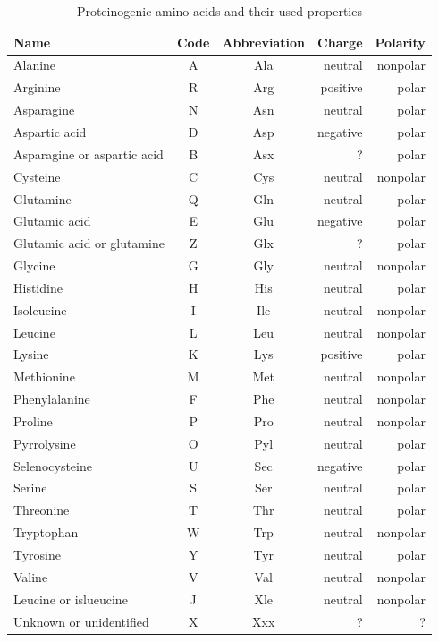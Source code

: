 \documentclass[11pt,twoside,a4paper]{book}
\begin{document}
\begin{table}
\begin{center}
 \begin{tabular}{lccrr}
\textbf{Name} & \textbf{Code} & \textbf{Abbreviation} & \textbf{Charge} & \textbf{Polarity} \\
\hline
Alanine & A & Ala & neutral & nonpolar  \\ \hline
Arginine & R & Arg & positive & polar  \\ \hline
Asparagine & N & Asn & neutral & polar \\ \hline 
Aspartic acid & D & Asp & negative & polar  \\ \hline
Asparagine or aspartic acid & B & Asx & ? & polar \\ \hline 
Cysteine & C & Cys & neutral & nonpolar  \\ \hline
Glutamine & Q & Gln & neutral & polar  \\ \hline
Glutamic acid & E & Glu & negative & polar \\ \hline
Glutamic acid or glutamine & Z & Glx & ? & polar \\ \hline
Glycine & G & Gly & neutral & nonpolar \\ \hline
Histidine & H & His & neutral & polar \\ \hline
Isoleucine & I & Ile & neutral & nonpolar \\ \hline
Leucine & L & Leu & neutral & nonpolar \\ \hline
Lysine & K & Lys & positive & polar \\ \hline
Methionine & M & Met & neutral & nonpolar  \\ \hline
Phenylalanine & F & Phe & neutral & nonpolar  \\ \hline
Proline & P & Pro & neutral & nonpolar \\ \hline
Pyrrolysine & O & Pyl  & neutral & polar  \\ \hline
Selenocysteine & U & Sec & negative & polar  \\ \hline
Serine & S & Ser & neutral & polar  \\ \hline
Threonine & T & Thr & neutral & polar \\ \hline
Tryptophan & W & Trp & neutral & nonpolar   \\ \hline
Tyrosine & Y & Tyr & neutral & polar  \\ \hline
Valine & V & Val & neutral & nonpolar \\ \hline
Leucine or islueucine & J & Xle & neutral & nonpolar \\ \hline
Unknown or unidentified & X & Xxx & ? & ? \\ \hline
\end{tabular}
\caption{Proteinogenic amino acids and their used properties}
\label{tab:aaprops}
\end{center}
\end{table}
\end{document}
